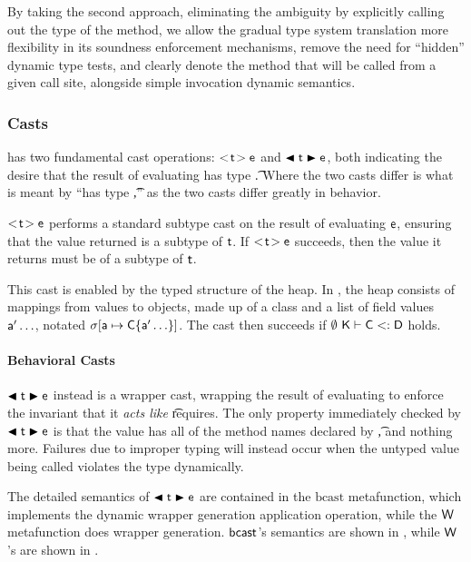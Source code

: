 \documentclass[USenglish]{tex/lipics-v2016}
\begin{document}
By taking the second approach, eliminating the ambiguity by explicitly
calling out the type of the method, we allow the gradual type system
translation more flexibility in its soundness enforcement mechanisms,
remove the need for ``hidden'' dynamic type tests, and clearly denote
the method that will be called from a given call site, alongside 
simple invocation dynamic semantics.


\subsubsection{Casts}

\kafka has two fundamental cast operations: $\SubCast\t\e$ and $\BehCast\t\e$,
both indicating the desire that the result of evaluating \e has type \t.
Where the two casts differ is what is meant by ``has type \t,'' as the two
casts differ greatly in behavior.

$\SubCast\t\e$ performs a standard subtype cast on the result of evaluating
$\e$, ensuring that the value returned is a subtype of $\t$. If $\SubCast\t\e$
succeeds, then the value it returns must be of a subtype of $\t$.

This cast is enabled by the typed structure of the \kafka heap. In \kafka, the
heap \s consists of mappings from values \a to objects, made up of a class \C
and a list of field values $\ap\ldots$, notated $\s[\a \mapsto
\C\{\ap\ldots\}]$. The cast then succeeds if $\StrSub \emptyset\K\C\D$ holds.

\paragraph*{Behavioral Casts}\label{bcastdesc}

$\BehCast\t\e$ instead is a wrapper cast, wrapping the result of evaluating \e
to enforce the invariant that it \emph{acts like} \t requires. The only
property immediately checked by $\BehCast\t\e$ is that the value has all of
the method names declared by \t, and nothing more. Failures due to improper
typing will instead occur when the untyped value being called violates
the type dynamically.

The detailed semantics of $\BehCast\t\e$ are contained in the $\text{bcast}$
metafunction, which implements the dynamic wrapper generation application
operation, while the ${\sf{W}}$ metafunction does wrapper generation.
${\sf{bcast}}$'s semantics are shown in , while
${\sf{W}}$'s are shown in .
\end{document}
